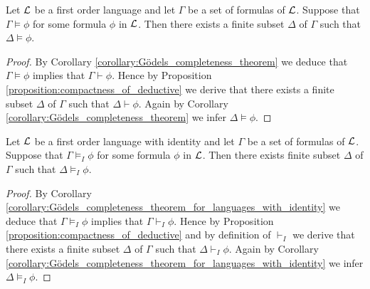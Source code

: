 \begin{corollary}\label{theorem:compactness_without_identity}
Let ${\mathcal L}$ be a first order language and let $\Gamma$ be a set of formulas of ${\mathcal L}$. Suppose that $\Gamma \vDash \phi$ for some formula $\phi$ in ${\mathcal L}$. Then there exists a finite subset $\Delta$ of $\Gamma$ such that $\Delta \vDash \phi$.
\end{corollary}
\begin{proof}
By Corollary \ref{corollary:Gödels_completeness_theorem} we deduce that $\Gamma \vDash \phi$ implies that $\Gamma \vdash \phi$. Hence by Proposition \ref{proposition:compactness_of_deductive} we derive that there exists a finite subset $\Delta$ of $\Gamma$ such that $\Delta \vdash \phi$. Again by Corollary \ref{corollary:Gödels_completeness_theorem} we infer $\Delta \vDash \phi$.
\end{proof}

\begin{corollary}\label{theorem:compactness_for_languages_with_identity}
Let ${\mathcal L}$ be a first order language with identity and let $\Gamma$ be a set of formulas of ${\mathcal L}$. Suppose that $\Gamma \vDash_I \phi$ for some formula $\phi$ in ${\mathcal L}$. Then there exists finite subset $\Delta$ of $\Gamma$ such that $\Delta \vDash_I \phi$.
\end{corollary}
\begin{proof}
By Corollary \ref{corollary:Gödels_completeness_theorem_for_languages_with_identity} we deduce that $\Gamma \vDash_I \phi$ implies that $\Gamma \vdash_I \phi$. Hence by Proposition \ref{proposition:compactness_of_deductive} and by definition of $\vdash_I$ we derive that there exists a finite subset $\Delta$ of $\Gamma$ such that $\Delta \vdash_I \phi$. Again by Corollary \ref{corollary:Gödels_completeness_theorem_for_languages_with_identity} we infer $\Delta \vDash_I \phi$.
\end{proof}



\small




